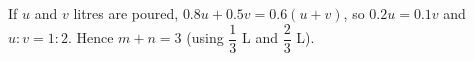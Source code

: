 If $u$ and $v$ litres are poured, $0.8u+0.5v=0.6(u+v)$, so $0.2u=0.1v$ and $u:v=1:2$. Hence $m+n=\boxed{3}$ (using $\dfrac13$ L and $\dfrac23$ L).
